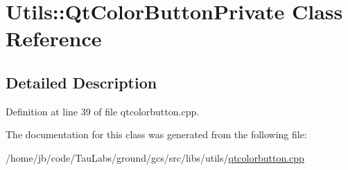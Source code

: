 \hypertarget{class_utils_1_1_qt_color_button_private}{\section{\-Utils\-:\-:\-Qt\-Color\-Button\-Private \-Class \-Reference}
\label{class_utils_1_1_qt_color_button_private}
}


\subsection{\-Detailed \-Description}


\-Definition at line 39 of file qtcolorbutton.\-cpp.



\-The documentation for this class was generated from the following file\-:\begin{DoxyCompactItemize}
\item 
/home/jb/code/\-Tau\-Labs/ground/gcs/src/libs/utils/\hyperlink{qtcolorbutton_8cpp}{qtcolorbutton.\-cpp}\end{DoxyCompactItemize}
